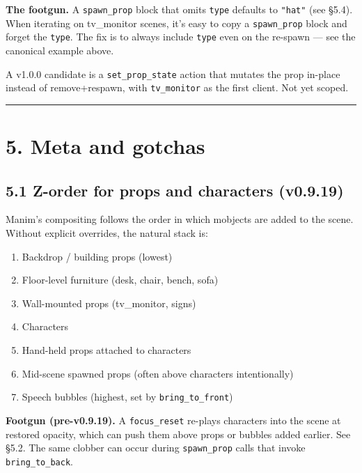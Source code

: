 \documentclass[
  12pt,
  letterpaper,
]{book}
\providecommand{\tightlist}{%
  \setlength{\itemsep}{0pt}\setlength{\parskip}{0pt}}
\begin{document}
\textbf{The footgun.} A \texttt{spawn\_prop} block that omits
\texttt{type} defaults to \texttt{"hat"} (see §5.4). When iterating on
tv\_monitor scenes, it's easy to copy a \texttt{spawn\_prop} block and
forget the \texttt{type}. The fix is to always include \texttt{type}
even on the re-spawn --- see the canonical example above.

A v1.0.0 candidate is a \texttt{set\_prop\_state} action that mutates
the prop in-place instead of remove+respawn, with \texttt{tv\_monitor}
as the first client. Not yet scoped.

\begin{center}\rule{0.5\linewidth}{0.5pt}\end{center}

\section{5. Meta and gotchas}\label{meta-and-gotchas}

\subsection{5.1 Z-order for props and characters (v0.9.19)}\label{z-order-for-props}

Manim's compositing follows the order in which mobjects are added to the
scene. Without explicit overrides, the natural stack is:

\begin{enumerate}
\def\labelenumi{\arabic{enumi}.}
\tightlist
\item
  Backdrop / building props (lowest)
\item
  Floor-level furniture (desk, chair, bench, sofa)
\item
  Wall-mounted props (tv\_monitor, signs)
\item
  Characters
\item
  Hand-held props attached to characters
\item
  Mid-scene spawned props (often above characters intentionally)
\item
  Speech bubbles (highest, set by \texttt{bring\_to\_front})
\end{enumerate}

\textbf{Footgun (pre-v0.9.19).} A \texttt{focus\_reset} re-plays
characters into the scene at restored opacity, which can push them above
props or bubbles added earlier. See §5.2. The same clobber can occur
during \texttt{spawn\_prop} calls that invoke \texttt{bring\_to\_back}.
\end{document}
